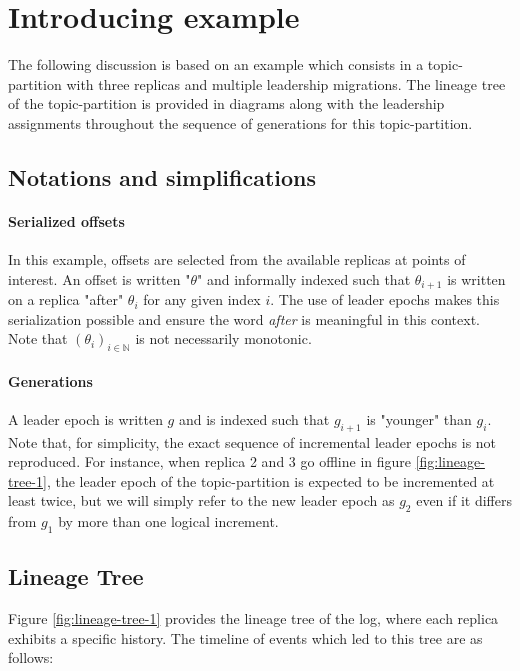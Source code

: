 \documentclass{article}
\begin{document}
\section{Introducing example}

The following discussion is based on an example which consists in a topic-partition with three replicas and multiple leadership migrations. The lineage tree of the topic-partition is provided in diagrams along with the leadership assignments throughout the sequence of generations for this topic-partition.

\subsection{Notations and simplifications}

\paragraph{Serialized offsets}
In this example, offsets are selected from the available replicas at points of interest. An offset is written "$\theta$" and informally indexed such that $\theta_{i+1}$ is written on a replica "after" $\theta_i$ for any given index $i$. The use of leader epochs makes this serialization possible and ensure the word \textit{after} is meaningful in this context. Note that $(\theta_i)_{i \in \mathbb{N}}$ is not necessarily monotonic. 

\paragraph{Generations}
A leader epoch is written $g$ and is indexed such that $g_{i+1}$ is "younger" than $g_i$. Note that, for simplicity, the exact sequence of incremental leader epochs is not reproduced. For instance, when replica 2 and 3 go offline in figure \ref{fig:lineage-tree-1}, the leader epoch of the topic-partition is expected to be incremented at least twice, but we will simply refer to the new leader epoch as $g_2$ even if it differs from $g_1$ by more than one logical increment.

\subsection{Lineage Tree}

\label{lineage_tree}
Figure \ref{fig:lineage-tree-1} provides the lineage tree of the log, where each replica exhibits a specific history.
The timeline of events which led to this tree are as follows:
\end{document}
